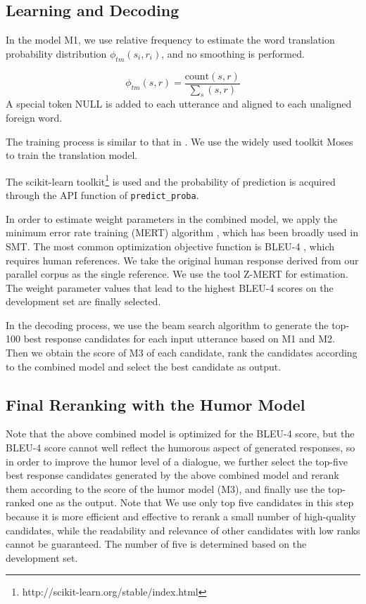 \documentclass[letterpaper]{article} %
\begin{document}
\begin{CJK*}{UTF8}{gbsn}
\subsection{Learning and Decoding}
In the model M1, we use relative frequency to estimate the word translation probability distribution $\phi_{tm}({s}_i, {r}_i)$, and no smoothing is performed. 

\begin{equation}
	\phi_{tm}(s, r) = \frac{\mathrm{count}(s,r)}{\sum_s (s,r)}
\end{equation}
A special token NULL is added to each utterance and aligned to each unaligned foreign word.

The training process is similar to that in \cite{ritter2011data}.
We use the widely used toolkit Moses \cite{koehn2007moses} to train the translation model.

The scikit-learn toolkit\footnote{http://scikit-learn.org/stable/index.html} is used and the probability of prediction is acquired through the API function of {\tt predict\_proba}.

In order to estimate weight parameters in the combined model, we apply the minimum error rate training (MERT) algorithm \cite{Och:2003:MER:1075096.1075117}, which has been broadly used in SMT.  The most common optimization objective function is BLEU-4
\cite{papineni2002bleu}, which requires human references. We take the original human response derived from our parallel corpus as the single reference. We use the tool Z-MERT \cite{zaidan2009z} for estimation. The weight parameter values that lead to the highest BLEU-4 scores on the development set are finally selected.

In the decoding process, we use the beam search algorithm to generate the top-100 best 
response candidates for each input utterance based on M1 and M2. Then we obtain the score of M3 of each candidate, rank the candidates according to the combined model and select the best candidate as output.

\subsection{Final Reranking with the Humor Model}

Note that the above combined model is optimized for the BLEU-4 score, but the BLEU-4 score cannot well reflect the humorous aspect of generated responses, so in order to improve the humor level of a dialogue, we further select the top-five best response candidates generated by the above combined model and rerank them according to the score of the humor model (M3), and finally use the top-ranked one as the output. Note that We use only top five candidates in this step because it is more efficient and effective to rerank a small number of high-quality candidates, while the readability and relevance of other candidates with low ranks cannot be guaranteed. The number of five is determined based on the development set.    


\end{CJK*}
\end{document}
